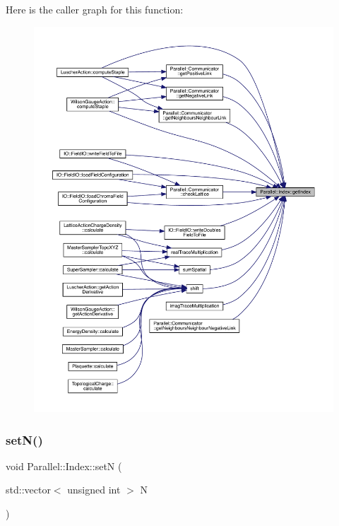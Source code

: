 Here is the caller graph for this function\+:\nopagebreak
\begin{figure}[H]
\begin{center}
\leavevmode
\includegraphics[width=350pt]{class_parallel_1_1_index_af31faeef1369fdc0997d1910e008bfe2_icgraph}
\end{center}
\end{figure}
\mbox{\label{class_parallel_1_1_index_ab8650936d7000d54b811dd128618f9ad}} 
\subsubsection{\texorpdfstring{setN()}{setN()}}
{\footnotesize\ttfamily void Parallel\+::\+Index\+::setN (\begin{DoxyParamCaption}\item[{std\+::vector$<$ unsigned int $>$}]{N }\end{DoxyParamCaption})\hspace{0.3cm}{\ttfamily [static]}}

